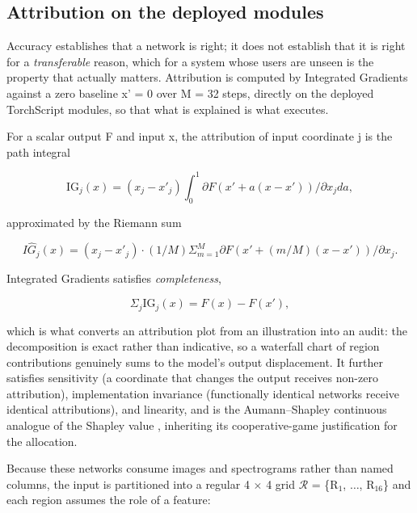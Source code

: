 \FloatBarrier

\subsection{Attribution on the deployed modules}

Accuracy establishes that a network is right; it does not establish that it is right for a \emph{transferable} reason, which for a system whose users are unseen is the property that actually matters. Attribution is computed by Integrated Gradients  against a zero baseline x' = 0 over M = 32 steps, directly on the deployed TorchScript modules, so that what is explained is what executes.

For a scalar output F and input x, the attribution of input coordinate j is the path integral

\begin{equation}
\label{eq:136}
\mathrm{IG}_j(x) = ( x_j - x'_j ) \int _{0}^{1} \partial F( x' + a(x - x') ) / \partial x_j da ,
\end{equation}

approximated by the Riemann sum

\begin{equation}
\label{eq:137}
I\hat{G}_j(x) = ( x_j - x'_j ) \cdot (1/M) \Sigma _{m=1}^{M} \partial F( x' + (m/M)(x - x') ) / \partial x_j .
\end{equation}

Integrated Gradients satisfies \emph{completeness},

\begin{equation}
\label{eq:138}
\Sigma _j \mathrm{IG}_j(x) = F(x) - F(x'),
\end{equation}

which is what converts an attribution plot from an illustration into an audit: the decomposition is exact rather than indicative, so a waterfall chart of region contributions genuinely sums to the model's output displacement. It further satisfies sensitivity (a coordinate that changes the output receives non-zero attribution), implementation invariance (functionally identical networks receive identical attributions), and linearity, and is the Aumann--Shapley  continuous analogue of the Shapley value , inheriting its cooperative-game justification for the allocation.

Because these networks consume images and spectrograms rather than named columns, the input is partitioned into a regular 4 $\times$ 4 grid $\mathcal{R}$ = \{R$_{1}$, $\dots$, R$_{16}$\} and each region assumes the role of a feature:

